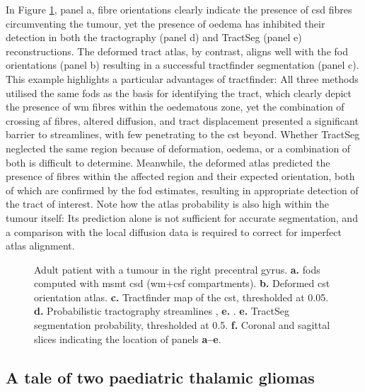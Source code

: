 \documentclass[12pt,phd,a4paper,twoside]{ucl_thesis}
\providecommand{\DIFaddtex}[1]{{\protect\color{blue} \sf #1}} %
\providecommand{\DIFdeltex}[1]{{\protect\color{red} \scriptsize #1}} %
\providecommand{\DIFaddFL}[1]{\DIFadd{#1}} %
\providecommand{\DIFdelFL}[1]{\DIFdel{#1}} %
\providecommand{\DIFaddbeginFL}{} %
\providecommand{\DIFaddendFL}{} %
\providecommand{\DIFdelbeginFL}{} %
\providecommand{\DIFdelendFL}{} %
\providecommand{\DIFadd}[1]{\texorpdfstring{\DIFaddtex{#1}}{#1}} %
\providecommand{\DIFdel}[1]{\texorpdfstring{\DIFdeltex{#1}}{}} %
\newcommand{\DIFscaledelfig}{0.5}
\newlength{\DIFdelgraphicswidth} %
\newlength{\DIFdelgraphicsheight} %
\newcommand{\DIFaddincludegraphics}[2][]{{\color{blue}\fbox{\DIFOincludegraphics[#1]{#2}}}} %
\newcommand{\DIFdelincludegraphics}[2][]{%
\sbox{\DIFdelgraphicsbox}{\DIFOincludegraphics[#1]{#2}}%
\settoboxwidth{\DIFdelgraphicswidth}{\DIFdelgraphicsbox} %
\settoboxtotalheight{\DIFdelgraphicsheight}{\DIFdelgraphicsbox} %
\scalebox{\DIFscaledelfig}{%
\parbox[b]{\DIFdelgraphicswidth}{\usebox{\DIFdelgraphicsbox}\\[-\baselineskip] \rule{\DIFdelgraphicswidth}{0em}}\llap{\resizebox{\DIFdelgraphicswidth}{\DIFdelgraphicsheight}{%
\setlength{\unitlength}{\DIFdelgraphicswidth}%
\begin{picture}(1,1)%
\thicklines\linethickness{2pt} %
{\color[rgb]{1,0,0}\put(0,0){\framebox(1,1){}}}%
{\color[rgb]{1,0,0}\put(0,0){\line( 1,1){1}}}%
{\color[rgb]{1,0,0}\put(0,1){\line(1,-1){1}}}%
\end{picture}%
}\hspace*{3pt}}} %
} %
\DeclareRobustCommand{\DIFaddbeginFL}{\DIFOaddbeginFL \let\includegraphics\DIFaddincludegraphics} %
\DeclareRobustCommand{\DIFaddendFL}{\DIFOaddendFL \let\includegraphics\DIFOincludegraphics} %
\DeclareRobustCommand{\DIFdelbeginFL}{\DIFOdelbeginFL \let\includegraphics\DIFdelincludegraphics} %
\DeclareRobustCommand{\DIFdelendFL}{\DIFOaddendFL \let\includegraphics\DIFOincludegraphics} %
\begin{document}
In Figure \ref{fig:oedema}, panel a, fibre orientations clearly indicate the presence of \gls{csd} fibres circumventing the tumour, yet the presence of oedema has inhibited their detection in both the tractography (panel d) and TractSeg (panel e) reconstructions.
The deformed tract atlas, by contrast, aligns well with the \gls{fod} orientations (panel b) resulting in a successful tractfinder segmentation  (panel c).
This example highlights a particular advantages of tractfinder:
All three methods utilised the same \glspl{fod} as the basis for identifying the tract, which clearly depict the presence of \gls{wm} fibres within the oedematous zone, yet the combination of crossing \gls{af} fibres, altered diffusion, and tract displacement presented a significant barrier to streamlines, with few penetrating to the \gls{cst} beyond.
Whether TractSeg neglected the same region because of deformation, oedema, or a combination of both is difficult to determine.
Meanwhile, the deformed atlas predicted the presence of fibres within the affected region and their expected orientation, both of which are confirmed by the \gls{fod} estimates, resulting in appropriate detection of the tract of interest.
Note how the atlas probability is also high within the tumour itself:
Its prediction alone is not sufficient for accurate segmentation, and a comparison with the local diffusion data is required to correct for imperfect atlas alignment.

\begin{figure}
  
  \caption[Tumour deformation modelling and oedema]{Adult patient with a tumour in the right precentral gyrus.
  \textbf{\sffamily a.} \Glspl{fod} computed with \gls{msmt} \gls{csd} (\gls{wm}+\gls{csf} compartments).
  \textbf{\sffamily b.} Deformed \gls{cst} orientation atlas.
  \textbf{\sffamily c.} Tractfinder map of the \gls{cst}, thresholded at 0.05.
  \textbf{\sffamily d.} Probabilistic tractography streamlines\DIFdelbeginFL \DIFdelFL{, \textbf{e.} }\DIFdelendFL \DIFaddbeginFL \DIFaddFL{.
  \textbf{\sffamily e.} }\DIFaddendFL TractSeg segmentation probability, thresholded at 0.5.
  \textbf{\sffamily f.} Coronal and sagittal slices indicating the location of panels \textbf{\sffamily a--e}.}
  \label{fig:oedema}
\end{figure}

\clearpage
\subsection{A tale of two paediatric thalamic gliomas}\label{sec:case}
\end{document}
